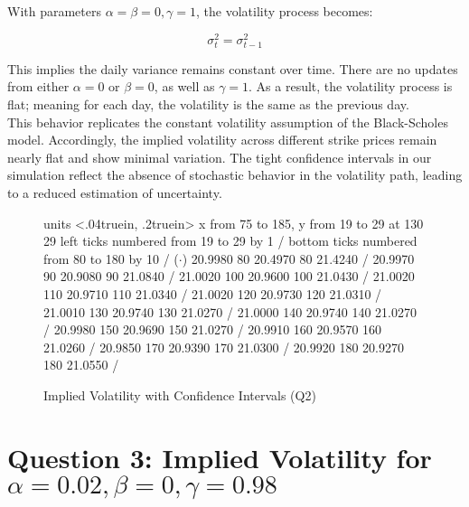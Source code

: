 \documentclass{report}
\begin{document}
With parameters \( \alpha = \beta = 0, \gamma = 1 \), the volatility process becomes:

\[
\sigma_t^2 = \sigma_{t-1}^2
\]

This implies the daily variance remains constant over time. There are no updates from either \( \alpha = 0 \) or  \( \beta = 0 \), as well as  \( \gamma = 1 \). As a result, the volatility process is flat; meaning for each day, the volatility is the same as the previous day. \\

This behavior replicates the constant volatility assumption of the Black-Scholes model. Accordingly, the implied volatility across different strike prices remain nearly flat and show minimal variation. The tight confidence intervals in our simulation reflect the absence of stochastic behavior in the volatility path, leading to a reduced estimation of uncertainty. \\




\begin{figure}[h!]
\centering
\beginpicture
\setcoordinatesystem units <.04truein, .2truein> 
\setplotarea x from 75 to 185, y from 19 to 29
 at 130 29
\axis left ticks numbered from 19 to 29 by 1 /
\axis bottom ticks numbered from 80 to 180 by 10 /
\setplotsymbol ({$\cdot$})
 20.9980 80 20.4970 80 21.4240 /
 20.9970 90 20.9080 90 21.0840 /
 21.0020 100 20.9600 100 21.0430 /
 21.0020 110 20.9710 110 21.0340 /
 21.0020 120 20.9730 120 21.0310 /
 21.0010 130 20.9740 130 21.0270 /
 21.0000 140 20.9740 140 21.0270 /
 20.9980 150 20.9690 150 21.0270 /
 20.9910 160 20.9570 160 21.0260 /
 20.9850 170 20.9390 170 21.0300 /
 20.9920 180 20.9270 180 21.0550 /
\endpicture
\caption{Implied Volatility with Confidence Intervals (Q2)}
\end{figure}


\newpage








\section*{Question 3: Implied Volatility for \(\alpha = 0.02, \beta = 0, \gamma = 0.98\)}
\end{document}
